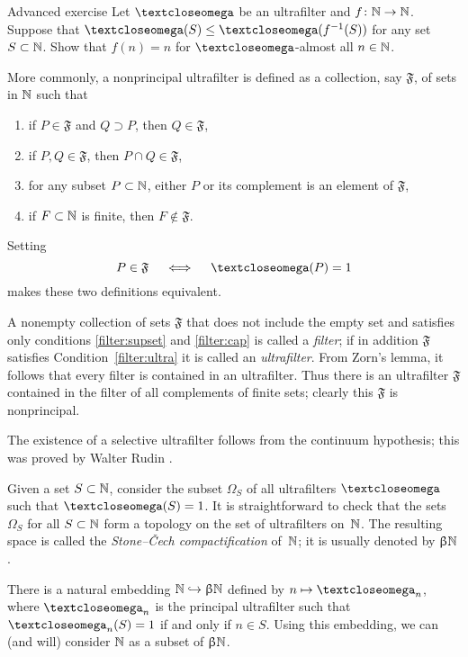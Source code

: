 \begin{thm}{Advanced exercise}\label{ex:ultrakatetov}
Let $\o$ be an ultrafilter and $f\:\NN\z\to \NN$.
Suppose that $\o(S)\le \o(f^{-1}(S))$ for any set $S\subset \NN$.
Show that $f(n)=n$ for $\o$-almost all $n\in\NN$.
\end{thm}

More commonly, a nonprincipal ultrafilter is defined as a collection, say $\mathfrak{F}$, of sets in $\mathbb{N}$ such that
\begin{enumerate}
\item\label{filter:supset} if $P\in \mathfrak{F}$ and $Q\supset P$, then $Q\in \mathfrak{F}$,
\item\label{filter:cap} if $P, Q\in \mathfrak{F}$, then $P\cap Q\in \mathfrak{F}$,
\item\label{filter:ultra} for any subset $P\subset\NN$, either $P$ or its complement is an element of $\mathfrak{F}$,
\item\label{filter:non-prin} if $F\subset \NN $ is finite, then $F\notin \mathfrak{F}$.
\end{enumerate}

Setting 
\[P\in\mathfrak{F}\quad\iff\quad\o(P)=1\] 
makes these two definitions equivalent.

A nonempty collection of sets $\mathfrak{F}$ that does not include the empty set and satisfies only conditions \ref{filter:supset} and \ref{filter:cap} is called a \emph{filter}; 
if in addition $\mathfrak{F}$ satisfies Condition~\ref{filter:ultra} it is called an \emph{ultrafilter}.
From Zorn's lemma, it follows that every filter is contained in an ultrafilter.
Thus there is an ultrafilter $\mathfrak{F}$ contained in the filter of all complements of finite sets; clearly this $\mathfrak{F}$ is nonprincipal.

The existence of a selective ultrafilter follows from the continuum hypothesis;
this was proved by Walter Rudin \cite{rudin}.

Given a set $S\subset \NN$, consider the subset $\Omega_S$ of all ultrafilters $\o$ such that $\o(S)=1$.
It is straightforward to check that the sets $\Omega_S$ for all $S\subset \NN$ form a topology on the set of ultrafilters on~$\mathbb{N}$. 
The resulting space is called the \emph{Stone--\v{C}ech compactification} of~$\mathbb{N}$; it is usually denoted by $\beta\NN$\index{ $\beta\NN$} .

There is a natural embedding $\NN\hookrightarrow\beta\NN$ defined by 
$n\mapsto\o_n$, where $\o_n$ is the principal ultrafilter such that $\o_n(S)=1$ if and only if $n\in S$. 
Using this embedding, we can (and will) consider $\mathbb{N}$ as a subset of $\beta\NN$.

